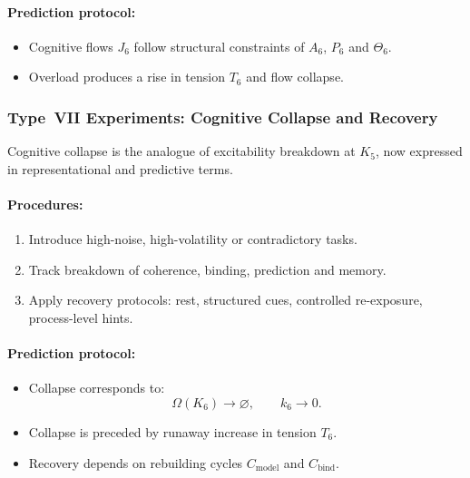 \paragraph{Prediction protocol:}

\begin{itemize}
    \item Cognitive flows $J_6$ follow structural constraints of $A_6$,
          $P_6$ and $\Theta_6$.
    \item Overload produces a rise in tension $T_6$ and 
          flow collapse.
\end{itemize}



\subsubsection{Type~VII Experiments: Cognitive Collapse and Recovery}

Cognitive collapse is the analogue of excitability breakdown at $K_5$,
now expressed in representational and predictive terms.

\paragraph{Procedures:}

\begin{enumerate}
    \item Introduce high-noise, high-volatility or contradictory tasks.
    \item Track breakdown of coherence, binding, prediction and memory.
    \item Apply recovery protocols: rest, structured cues, 
          controlled re-exposure, process-level hints.
\end{enumerate}

\paragraph{Prediction protocol:}

\begin{itemize}
    \item Collapse corresponds to:
          \[
             \Omega(K_6) \rightarrow \varnothing,
             \qquad k_6 \rightarrow 0.
          \]
    \item Collapse is preceded by runaway increase in tension $T_6$.
    \item Recovery depends on rebuilding cycles $C_{\mathrm{model}}$ 
          and $C_{\mathrm{bind}}$.
\end{itemize}



